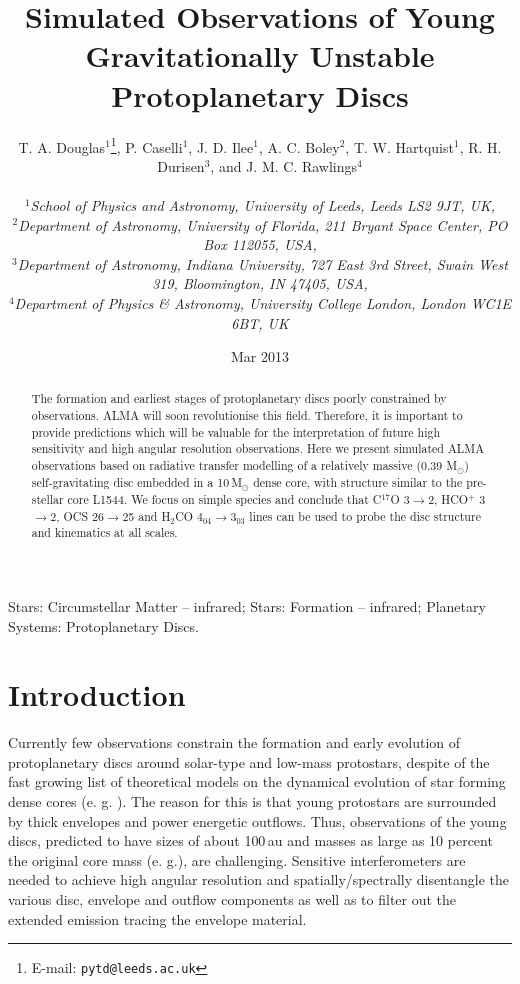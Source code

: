 \documentclass[useAMS,usenatbib]{mn2e}
\title[Young protoplanetary discs]{Simulated Observations of Young Gravitationally Unstable Protoplanetary Discs}
\author[T.~A.~Douglas et al.]
{\parbox{\textwidth}{T. A. Douglas$^{1}$\thanks{E-mail: \texttt{pytd@leeds.ac.uk}},
P. Caselli$^{1}$,
J. D. Ilee$^{1}$,
A. C. Boley$^{2}$,
T. W. Hartquist$^{1}$,
R. H. Durisen$^{3}$, and
J. M. C. Rawlings$^{4}$\\
\vspace{0.1cm}\\
{\small{\it$^{1}$School of Physics and Astronomy, University of Leeds, Leeds LS2 9JT, UK,}} \\
{\small{\it$^{2}$Department of Astronomy, University of Florida, 211 Bryant Space Center, PO Box 112055, USA,}}\\
{\small{\it$^{3}$Department of Astronomy, Indiana University, 727 East 3rd Street, Swain West 319, Bloomington, IN 47405, USA,}}\\
{\small{\it$^{4}$Department of Physics \& Astronomy, University College London, London WC1E 6BT, UK}}\\}}
\begin{document}
\date{Mar 2013}

\pagerange{\pageref{firstpage}--\pageref{lastpage}} 

\maketitle

\label{firstpage}

\begin{abstract}
The formation and earliest stages of protoplanetary discs poorly constrained by observations. ALMA will soon revolutionise this field. Therefore, it is important to provide predictions which will be valuable for the interpretation of future high sensitivity and high angular resolution observations. Here we present simulated ALMA observations based on radiative transfer modelling of a relatively massive (0.39 M$_{\odot}$) self-gravitating disc embedded in a 10\,M$_{\odot}$ dense core, with structure similar to the pre-stellar core L1544. We focus on simple species and conclude that  C$^{17}$O 3$\rightarrow$2, HCO$^+$ 3$\rightarrow$2, OCS 26$\rightarrow$25 and H$_2$CO 4$_{04}\rightarrow$3$_{03}$ lines can be used to probe the disc structure and kinematics at all scales. 
\end{abstract}

\begin{keywords}
Stars: Circumstellar Matter -- infrared; Stars: Formation -- infrared; Planetary Systems: Protoplanetary Discs.
\end{keywords}

\section{Introduction}

Currently few observations constrain the formation and early evolution of protoplanetary discs around solar-type and low-mass protostars, despite of the fast growing list of theoretical models on the dynamical evolution of star forming dense cores (e. g. \citealt{Krasnopolsky2011,Machida2011,Braiding2012,Joos2013}). The reason for this is that young protostars are surrounded by thick envelopes and power energetic outflows. Thus, observations of the young discs, predicted to have sizes of about 100\,au and masses as large as 10 percent the original core mass (e. g.\citealt*{Joos2012,Hayfield2011,Machida2011}), are challenging. Sensitive interferometers are needed to achieve high angular resolution and spatially/spectrally disentangle the various disc, envelope and outflow components as well as to filter out the extended emission tracing the envelope material. \smallskip
\end{document}

